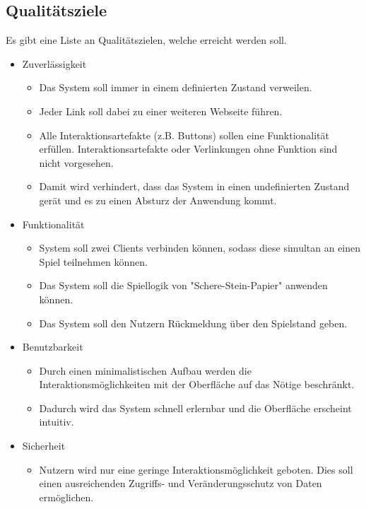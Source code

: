 \documentclass[conference]{IEEEtran}
\begin{document}
\begin{itemize}
\section{Qualitätsziele}

Es gibt eine Liste an Qualitätszielen, welche erreicht werden soll.


\begin{itemize}
    \item Zuverlässigkeit \\
     \begin{itemize}
    \item  Das System soll immer in einem definierten Zustand verweilen.
    \item Jeder Link soll dabei zu einer weiteren Webseite führen.
    \item Alle Interaktionsartefakte (z.B. Buttons) sollen eine Funktionalität erfüllen. Interaktionsartefakte oder Verlinkungen ohne Funktion sind nicht vorgesehen.
    \item Damit wird verhindert, dass das System in einen undefinierten Zustand gerät und es zu einen Absturz der Anwendung kommt.
  \end{itemize}

    \item Funktionalität \\
    \begin{itemize}
        \item System soll zwei Clients verbinden können, sodass diese simultan an einen Spiel teilnehmen können.
        \item Das System soll die Spiellogik von "Schere-Stein-Papier" anwenden können.
        \item  Das System soll den Nutzern Rückmeldung über den Spielstand geben.
    \end{itemize}
    \item Benutzbarkeit \\
    \begin{itemize}
        \item Durch einen minimalistischen Aufbau werden die Interaktionsmöglichkeiten mit der Oberfläche auf das Nötige beschränkt.
        \item Dadurch wird das System schnell erlernbar und die Oberfläche erscheint intuitiv.
    \end{itemize}
    \item Sicherheit \\
    \begin{itemize}
        \item Nutzern wird nur eine geringe Interaktionsmöglichkeit geboten. Dies soll einen ausreichenden Zugriffs- und Veränderungsschutz von Daten ermöglichen.
    \end{itemize}


\end{itemize}
\end{itemize}
\end{document}
